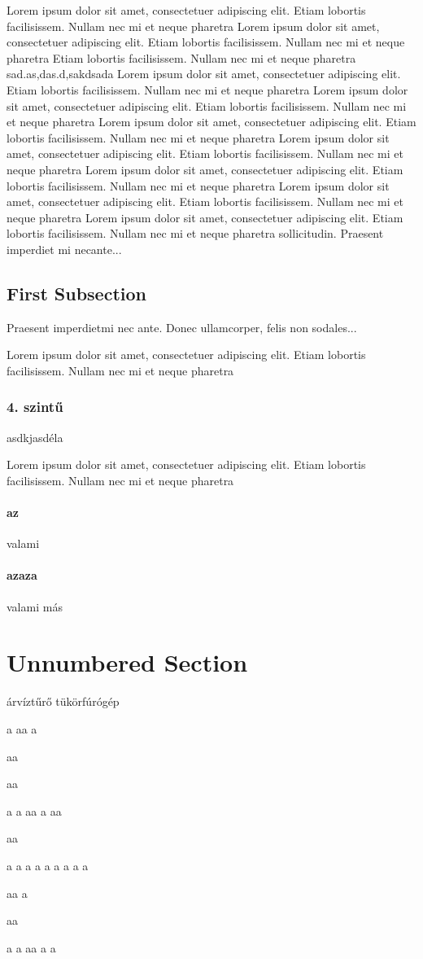\documentclass[12pt, a4paper]{book}
\begin{document}
Lorem ipsum dolor sit amet, consectetuer adipiscing elit.  
Etiam lobortis facilisissem.  Nullam nec mi et neque pharetra  
Lorem ipsum dolor sit amet, consectetuer adipiscing elit.  
Etiam lobortis facilisissem.  Nullam nec mi et neque pharetra Etiam lobortis facilisissem.  Nullam nec mi et neque pharetra 
 sad.as,das.d,sakdsada
Lorem ipsum dolor sit amet, consectetuer adipiscing elit.  
Etiam lobortis facilisissem.  Nullam nec mi et neque pharetra  
Lorem ipsum dolor sit amet, consectetuer adipiscing elit.  
Etiam lobortis facilisissem.  Nullam nec mi et neque pharetra  
Lorem ipsum dolor sit amet, consectetuer adipiscing elit.  
Etiam lobortis facilisissem.  Nullam nec mi et neque pharetra  
Lorem ipsum dolor sit amet, consectetuer adipiscing elit.  
Etiam lobortis facilisissem.  Nullam nec mi et neque pharetra  
Lorem ipsum dolor sit amet, consectetuer adipiscing elit.  
Etiam lobortis facilisissem.  Nullam nec mi et neque pharetra  
Lorem ipsum dolor sit amet, consectetuer adipiscing elit.  
Etiam lobortis facilisissem.  Nullam nec mi et neque pharetra  
Lorem ipsum dolor sit amet, consectetuer adipiscing elit.  
Etiam lobortis facilisissem.  Nullam nec mi et neque pharetra sollicitudin.  Praesent imperdiet mi necante...
 
\subsection{First Subsection}
Praesent imperdietmi nec ante. Donec ullamcorper, felis non sodales...
 
Lorem ipsum dolor sit amet, consectetuer adipiscing elit.  
Etiam lobortis facilisissem.  Nullam nec mi et neque pharetra 
\subsubsection{4. szintű}
asdkjasdéla
 
Lorem ipsum dolor sit amet, consectetuer adipiscing elit.  
Etiam lobortis facilisissem.  Nullam nec mi et neque pharetra 
\paragraph{az}
valami 
\paragraph{azaza} 
valami más
 
\section*{Unnumbered Section}
árvíztűrő tükörfúrógép

a
aa
a

aa

aa

a
a
aa
a
aa

aa

a
a
a
a
a
a
a
a
a

aa
a

aa

a
a
aa
a
a
\end{document}
